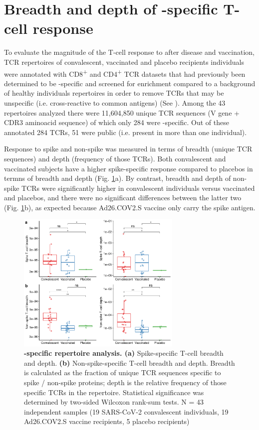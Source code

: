 \section*{Breadth and depth of \covid-specific T-cell response}

To evaluate the magnitude of the T-cell response to \covid{} after disease and vaccination, TCR repertoires of convalescent, vaccinated and placebo recipients individuals were annotated with CD8\textsuperscript{+} and CD4\textsuperscript{+} TCR datasets that had previously been determined to be \covid-specific and screened for enrichment compared to a background of healthy individuals repertoires in order to remove TCRs that may be unspecific (i.e. cross-reactive to common antigens) (See ). Among the 43 repertoires analyzed there were 11,604,850 unique TCR sequences (V gene + CDR3 aminoacid sequence) of which only 284 were \covid-specific. Out of these annotated 284 TCRs, 51 were public (i.e. present in more than one individual).

Response to \covid{} spike and non-spike was measured in terms of breadth (unique TCR sequences) and depth (frequency of those TCRs). Both convalescent and vaccinated subjects have a higher spike-specific response compared to placebos in termns of breadth and depth (Fig. \ref{fig:bd}a). By contrast, breadth and depth of non-spike TCRs were significantly higher in convalescent individuals versus vaccinated and placebos, and there were no significant differences between the latter two (Fig. \ref{fig:bd}b), as expected because Ad26.COV2.S vaccine only carry the spike antigen.

\begin{figure}[t]
	\centering
	\includegraphics[width=0.7\textwidth,keepaspectratio]{figures/fig2.pdf}
	\caption{\textbf{\covid-specific \TCRB{} repertoire analysis. (a)} Spike-specific T-cell breadth and depth. \textbf{(b)} Non-spike-specific T-cell breadth and depth. Breadth is calculated as the fraction of unique TCR sequences specific to spike / non-spike proteins; depth is the relative frequency of those specific TCRs in the repertoire. Statistical significance was determined by two-sided Wilcoxon rank-sum tests. N = 43 independent samples (19 SARS-CoV-2 convalescent individuals, 19 Ad26.COV2.S vaccine recipients, 5 placebo recipients)}
	\label{fig:bd}
\end{figure}

